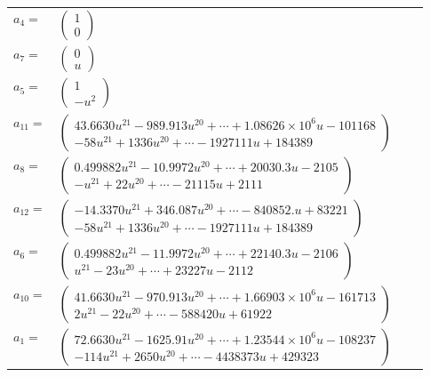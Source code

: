 \documentclass[1p]{elsarticle_modified}
\theoremstyle{definition}
\begin{document}
\begin{tabular}{m{7pt} m{180pt} m{7pt} m{180pt} }
\flushright $a_{4}=$&$\begin{pmatrix}1\\0\end{pmatrix}$ \\
\flushright $a_{7}=$&$\begin{pmatrix}0\\u\end{pmatrix}$ \\
\flushright $a_{5}=$&$\begin{pmatrix}1\\- u^2\end{pmatrix}$ \\
\flushright $a_{11}=$&$\begin{pmatrix}43.6630 u^{21}-989.913 u^{20}+\cdots+1.08626\times10^{6} u-101168\\-58 u^{21}+1336 u^{20}+\cdots-1927111 u+184389\end{pmatrix}$ \\
\flushright $a_{8}=$&$\begin{pmatrix}0.499882 u^{21}-10.9972 u^{20}+\cdots+20030.3 u-2105\\- u^{21}+22 u^{20}+\cdots-21115 u+2111\end{pmatrix}$ \\
\flushright $a_{12}=$&$\begin{pmatrix}-14.3370 u^{21}+346.087 u^{20}+\cdots-840852. u+83221\\-58 u^{21}+1336 u^{20}+\cdots-1927111 u+184389\end{pmatrix}$ \\
\flushright $a_{6}=$&$\begin{pmatrix}0.499882 u^{21}-11.9972 u^{20}+\cdots+22140.3 u-2106\\u^{21}-23 u^{20}+\cdots+23227 u-2112\end{pmatrix}$ \\
\flushright $a_{10}=$&$\begin{pmatrix}41.6630 u^{21}-970.913 u^{20}+\cdots+1.66903\times10^{6} u-161713\\2 u^{21}-22 u^{20}+\cdots-588420 u+61922\end{pmatrix}$ \\
\flushright $a_{1}=$&$\begin{pmatrix}72.6630 u^{21}-1625.91 u^{20}+\cdots+1.23544\times10^{6} u-108237\\-114 u^{21}+2650 u^{20}+\cdots-4438373 u+429323\end{pmatrix}$ \\

\end{tabular}
\end{document}
